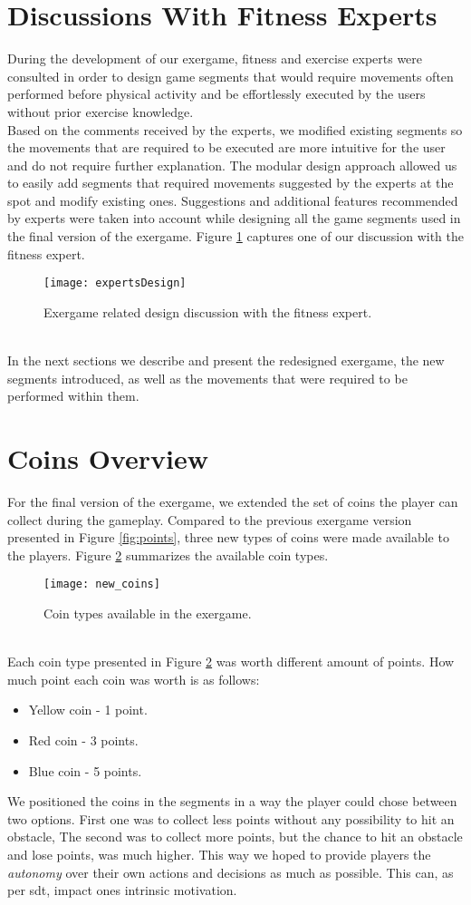 \section{Discussions With Fitness Experts}
During the development of our exergame, fitness and exercise experts were consulted in order to design game segments that would require movements often performed before physical activity and be effortlessly executed by the users without prior exercise knowledge. \\Based on the comments received by the experts, we modified existing segments so the movements that are required to be executed are more intuitive for the user and do not require further explanation. The modular design approach allowed us to easily add segments that required movements suggested by the experts at the spot and modify existing ones. Suggestions and additional features recommended by experts were taken into account while designing all the game segments used in the final version of the exergame.  Figure \ref{fig:expDesign} captures one of our discussion with the fitness expert.\\  
 \begin{figure}[h]
    \centering
    \texttt{[image: expertsDesign]}
    \caption{Exergame related design discussion with the fitness expert.}
    \label{fig:expDesign}
\end{figure}\\
In the next sections we describe and present the redesigned exergame, the new segments introduced, as well as the movements that were required to be performed within them.\pagebreak
\section{Coins Overview}
For the final version of the exergame, we extended the set of coins the player can collect during the gameplay. Compared to the previous exergame version presented in Figure \ref{fig:points}, three new types of coins were made available to the players. Figure \ref{fig:new_coins} summarizes the available coin types.  
\begin{figure}[h]
    \centering
    \texttt{[image: new\_coins]}
    \caption{Coin types available in the exergame.}
    \label{fig:new_coins}
\end{figure}\\
Each coin type presented in Figure \ref{fig:new_coins}  was worth different amount of points. How much point each coin was worth is as follows:
\begin{itemize}
\item Yellow coin - 1 point.
\item Red coin - 3 points.
\item Blue coin - 5 points.
\end{itemize}
We positioned the coins in the segments in a way the player could chose between two options. First one was to collect less points without any possibility to hit an obstacle, The second was to collect more points, but the chance to hit an obstacle and lose points, was much higher. This way we hoped to provide players the \textit{autonomy} over their own actions and decisions as much as possible. This can, as per \acrshort{sdt}, impact ones intrinsic motivation. 
